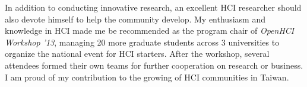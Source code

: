 \noindent
In addition to conducting innovative research, 
an excellent HCI researcher should also devote himself to help the community develop.
My enthusiasm and knowledge in HCI made me be recommended as the program chair of \textit{OpenHCI Workshop '13},
managing 20 more graduate students across 3 universities to organize the national event for HCI starters.
After the workshop, several attendees formed their own teams for further cooperation on research or business. 
I am proud of my contribution to the growing of HCI communities in Taiwan. \\





